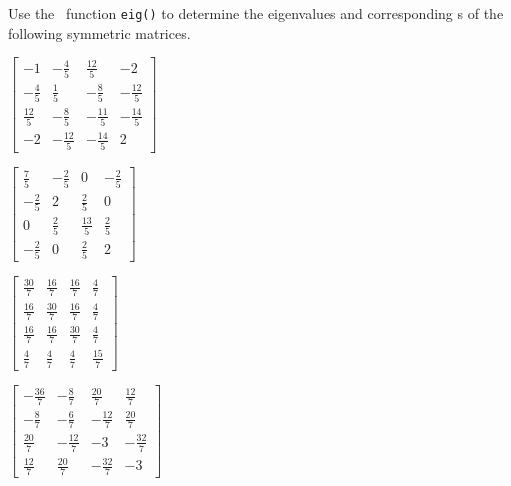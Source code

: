 \begin{exercise}  
Use the \script\ function \verb|eig()| to determine the eigenvalues and corresponding s of the following symmetric matrices.
\begin{Parts}
\item  \(\begin{bmatrix} -1 & -\frac{4}{5} & \frac{12}{5} & -2
\\ -\frac{4}{5} & \frac{1}{5} & -\frac{8}{5} & -\frac{12}{5}
\\ \frac{12}{5} & -\frac{8}{5} & -\frac{11}{5} & -\frac{14}{5}
\\ -2 & -\frac{12}{5} & -\frac{14}{5} & 2
\end{bmatrix}\)

\item  \(\begin{bmatrix} \frac{7}{5} & -\frac{2}{5} & 0 & -\frac{2}{5}
\\ -\frac{2}{5} & 2 & \frac{2}{5} & 0
\\ 0 & \frac{2}{5} & \frac{13}{5} & \frac{2}{5}
\\ -\frac{2}{5} & 0 & \frac{2}{5} & 2
\end{bmatrix}\)

\begin{reduce}
\item  \(\begin{bmatrix} \frac{30}{7} & \frac{16}{7} & \frac{16}{7} & \frac{4}{7}
\\ \frac{16}{7} & \frac{30}{7} & \frac{16}{7} & \frac{4}{7}
\\ \frac{16}{7} & \frac{16}{7} & \frac{30}{7} & \frac{4}{7}
\\ \frac{4}{7} & \frac{4}{7} & \frac{4}{7} & \frac{15}{7}
\end{bmatrix}\)

\item  \(\begin{bmatrix} -\frac{36}{7} & -\frac{8}{7} & \frac{20}{7} & \frac{12}{7}
\\ -\frac{8}{7} & -\frac{6}{7} & -\frac{12}{7} & \frac{20}{7}
\\ \frac{20}{7} & -\frac{12}{7} & -3 & -\frac{32}{7}
\\ \frac{12}{7} & \frac{20}{7} & -\frac{32}{7} & -3
\end{bmatrix}\)


\end{reduce}
\end{Parts}
\end{exercise}
